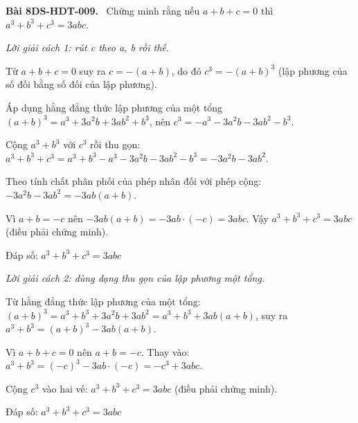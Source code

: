 \documentclass[12pt,a4paper]{article}
\newenvironment{problem}[1][]{\par\medskip\noindent\textbf{Bài #1.}\ }{\par}
\newenvironment{solution}[1][]{\par\noindent\textit{Lời giải #1.}\par}{\par}
\begin{document}
\begin{problem}[8DS-HDT-009]
Chứng minh rằng nếu $a + b + c = 0$ thì $a^3 + b^3 + c^3 = 3abc$.

\begin{solution}[cách 1: rút c theo a, b rồi thế]
Từ $a + b + c = 0$ suy ra $c = -(a + b)$, do đó $c^3 = -(a + b)^3$ (lập phương của số đối bằng số đối của lập phương).

Áp dụng hằng đẳng thức lập phương của một tổng $(a + b)^3 = a^3 + 3a^2b + 3ab^2 + b^3$, nên $c^3 = -a^3 - 3a^2b - 3ab^2 - b^3$.

Cộng $a^3 + b^3$ với $c^3$ rồi thu gọn: $a^3 + b^3 + c^3 = a^3 + b^3 - a^3 - 3a^2b - 3ab^2 - b^3 = -3a^2b - 3ab^2$.

Theo tính chất phân phối của phép nhân đối với phép cộng: $-3a^2b - 3ab^2 = -3ab(a + b)$.

Vì $a + b = -c$ nên $-3ab(a + b) = -3ab \cdot (-c) = 3abc$. Vậy $a^3 + b^3 + c^3 = 3abc$ (điều phải chứng minh).

Đáp số: $\boxed{a^3 + b^3 + c^3 = 3abc}$
\end{solution}

\begin{solution}[cách 2: dùng dạng thu gọn của lập phương một tổng]
Từ hằng đẳng thức lập phương của một tổng: $(a + b)^3 = a^3 + b^3 + 3a^2b + 3ab^2 = a^3 + b^3 + 3ab(a + b)$, suy ra $a^3 + b^3 = (a + b)^3 - 3ab(a + b)$.

Vì $a + b + c = 0$ nên $a + b = -c$. Thay vào: $a^3 + b^3 = (-c)^3 - 3ab \cdot (-c) = -c^3 + 3abc$.

Cộng $c^3$ vào hai vế: $a^3 + b^3 + c^3 = 3abc$ (điều phải chứng minh).

Đáp số: $\boxed{a^3 + b^3 + c^3 = 3abc}$
\end{solution}
\end{problem}
\end{document}
